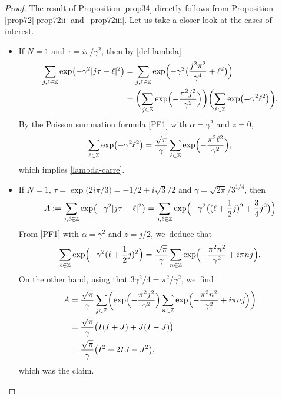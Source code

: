 \documentclass[10pt]{amsart}
\theoremstyle{definition}
\let\EE\exp
\newcommand\Z{\mathbb Z}
\begin{document}
\begin{proof}
The result of Proposition \ref{prop34} directly follows from Proposition \ref{prop72}\eqref{prop72ii} and~\eqref{prop72iii}. Let us take a closer look at the cases of interest.
\begin{itemize}
\item
If $N=1$ and $\tau={i \pi }/{\gamma^2}$, then by \eqref{def-lambda}
\begin{align*}
\sum_{j, \ell\in \Z}\EE\bigl({-\gamma^2 |j{\tau}-\ell|^{2}}\bigr)&= \sum_{j, \ell\in \Z}\EE\Bigl({-\gamma^2 \bigl(\frac{j^2 \pi^2}{\gamma^4}+ \ell^2\bigr)}\Bigr) \\
&= \biggl(\sum_{j\in\Z}\EE\Bigl(-\frac{\pi^2j^2}{\gamma^2} \Bigr)\biggr) \biggl(\sum_{\ell\in\Z}\EE\bigl(- \gamma^2 \ell^2\bigr)\biggr).
\end{align*}
By the Poisson summation formula \eqref{PF1} with $\alpha=\gamma^2$ and $z=0$,
\[
\sum_{\ell\in\Z}\EE\bigl(- \gamma^2 \ell^2\bigr)=\frac{\sqrt{\pi}}\gamma \sum_{\ell\in\Z}\EE\Bigl(-\frac{\pi^2\ell^2}{\gamma^2}\Bigr),
\]
which implies \eqref{lambda-carre}.

\item
If $N=1$, $\tau= \EE\bigl({2 i\pi/3}\bigr)=-1/2+ i \sqrt{3}/2$ and $\gamma={\sqrt{2\pi}}/{3^{1/4}}$, then
\[
A:= \sum_{j, \ell\in \Z}\EE\bigl(-\gamma^2 |j{\tau}-\ell|^{2}\bigr)= \sum_{j, \ell\in \Z}\EE\Bigl(-\gamma^2 \bigl((\ell+\frac12 j)^2+ \frac 34 j^2\bigr)\Bigr) 
\]
From \eqref{PF1} with $\alpha =\gamma^2$ and $z=j/2$, we~deduce that
\[
\sum_{ \ell\in \Z}\EE\Bigl(-\gamma^2 (\ell+\frac12 j)^2\Bigr) =\frac{\sqrt{\pi}}\gamma \sum_{ n\in \Z}\EE\Bigl(-\frac{\pi^2n^2}{\gamma^2}+i \pi n j\Bigr). 
\]
On the other hand, using that $3 \gamma^2/4= {\pi^2}/{\gamma^2}$, we~find
\begin{align*}
A &= \frac{\sqrt{\pi}}\gamma \sum_{j \in \Z}\biggl(\EE\Bigl(- \frac{\pi^2j^2}{\gamma^2 }\Bigr) \sum_{ n\in \Z}\EE\Bigl(-\frac{\pi^2n^2}{\gamma^2}+i \pi n j \Bigr)\biggr) \\
&= \frac{\sqrt{\pi}}\gamma \bigl(I(I+J)+J(I-J)\bigr) \\
&= \frac{\sqrt{\pi}}\gamma \bigl(I^2+2IJ-J^2\bigr),
\end{align*}
which was the claim.\qedhere
\end{itemize}
\end{proof}
\end{document}

